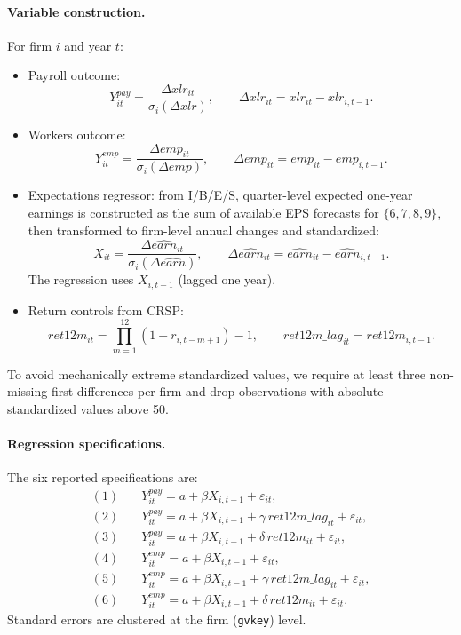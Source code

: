 \paragraph{Variable construction.}
For firm \(i\) and year \(t\):
\begin{itemize}
\item Payroll outcome:
\[
Y^{pay}_{it}=\frac{\Delta xlr_{it}}{\sigma_i(\Delta xlr)},
\qquad
\Delta xlr_{it}=xlr_{it}-xlr_{i,t-1}.
\]
\item Workers outcome:
\[
Y^{emp}_{it}=\frac{\Delta emp_{it}}{\sigma_i(\Delta emp)},
\qquad
\Delta emp_{it}=emp_{it}-emp_{i,t-1}.
\]
\item Expectations regressor: from I/B/E/S, quarter-level expected one-year earnings is constructed as the sum of available EPS forecasts for \(\{6,7,8,9\}\), then transformed to firm-level annual changes and standardized:
\[
X_{it}=\frac{\Delta \widehat{earn}_{it}}{\sigma_i(\Delta \widehat{earn})},
\qquad
\Delta \widehat{earn}_{it}=\widehat{earn}_{it}-\widehat{earn}_{i,t-1}.
\]
The regression uses \(X_{i,t-1}\) (lagged one year).
\item Return controls from CRSP:
\[
ret12m_{it}=\prod_{m=1}^{12}(1+r_{i,t-m+1})-1,
\qquad
ret12m\_lag_{it}=ret12m_{i,t-1}.
\]
\end{itemize}
To avoid mechanically extreme standardized values, we require at least three non-missing first differences per firm and drop observations with absolute standardized values above 50.

\paragraph{Regression specifications.}
The six reported specifications are:
\begin{align*}
(1)\quad & Y^{pay}_{it}=a+\beta X_{i,t-1}+\varepsilon_{it},\\
(2)\quad & Y^{pay}_{it}=a+\beta X_{i,t-1}+\gamma\,ret12m\_lag_{it}+\varepsilon_{it},\\
(3)\quad & Y^{pay}_{it}=a+\beta X_{i,t-1}+\delta\,ret12m_{it}+\varepsilon_{it},\\
(4)\quad & Y^{emp}_{it}=a+\beta X_{i,t-1}+\varepsilon_{it},\\
(5)\quad & Y^{emp}_{it}=a+\beta X_{i,t-1}+\gamma\,ret12m\_lag_{it}+\varepsilon_{it},\\
(6)\quad & Y^{emp}_{it}=a+\beta X_{i,t-1}+\delta\,ret12m_{it}+\varepsilon_{it}.
\end{align*}
Standard errors are clustered at the firm (\texttt{gvkey}) level.

